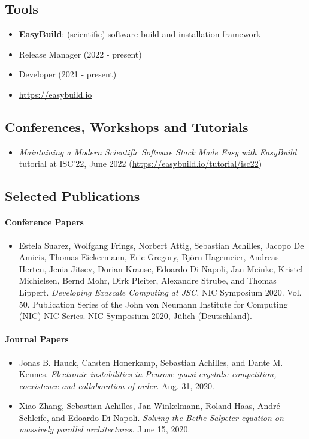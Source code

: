 \subsection*{Tools}

\begin{itemize}
\item[] \textbf{EasyBuild}: (scientific) software build and installation framework
\item[] Release Manager (2022 - present)
\item[] Developer (2021 - present)
\item[] \url{https://easybuild.io}
\end{itemize}

\subsection*{Conferences, Workshops and Tutorials}
\begin{itemize}
\item[] \emph{Maintaining a Modern Scientific Software Stack Made Easy with EasyBuild} tutorial at ISC'22, June 2022 (\url{https://easybuild.io/tutorial/isc22})
\end{itemize}

\subsection*{Selected Publications}

\paragraph{Conference Papers}

\begin{itemize}
\item[] Estela Suarez, Wolfgang Frings, Norbert Attig, Sebastian Achilles, Jacopo De Amicis, Thomas
Eickermann, Eric Gregory, Björn Hagemeier, Andreas Herten, Jenia Jitsev, Dorian Krause,
Edoardo Di Napoli, Jan Meinke, Kristel Michielsen, Bernd Mohr, Dirk Pleiter, Alexandre
Strube, and Thomas Lippert. \emph{Developing Exascale Computing at JSC.} NIC Symposium
2020. Vol. 50. Publication Series of the John von Neumann Institute for Computing (NIC)
NIC Series. NIC Symposium 2020, Jülich (Deutschland).
\end{itemize}

\paragraph{Journal Papers}

\begin{itemize}
  \item [] Jonas B. Hauck, Carsten Honerkamp, Sebastian Achilles, and Dante M. Kennes. \emph{Electronic
instabilities in Penrose quasi-crystals: competition, coexistence and collaboration of order.} Aug. 31, 2020.
  \item[] Xiao Zhang, Sebastian Achilles, Jan Winkelmann, Roland Haas, André Schleife, and Edoardo Di
Napoli. \emph{Solving the Bethe-Salpeter equation on massively parallel architectures.} June 15, 2020.
\end{itemize}


\newpage
